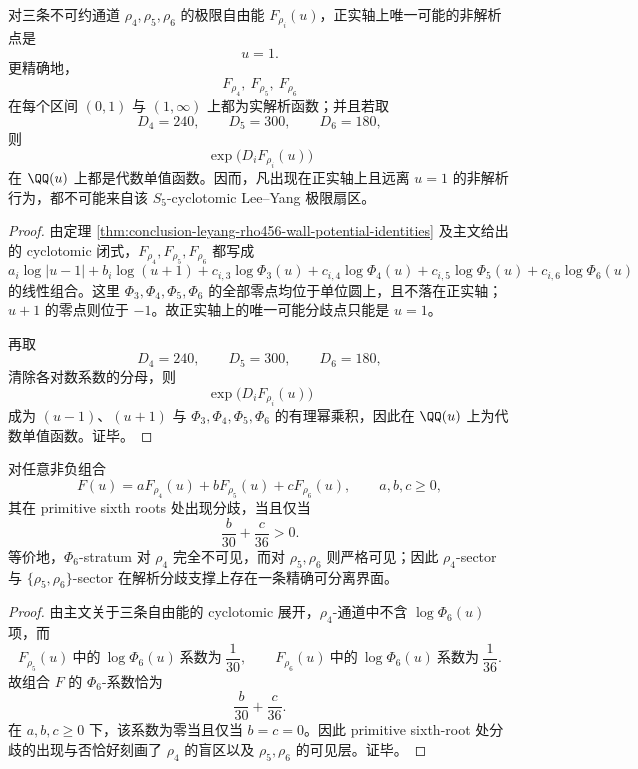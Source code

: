 \begin{theorem}\label{thm:conclusion-leyang-rho456-positive-axis-singularity-exclusion}
对三条不可约通道 \(\rho_4,\rho_5,\rho_6\) 的极限自由能 \(F_{\rho_i}(u)\)，正实轴上唯一可能的非解析点是
\[
u=1.
\]
更精确地，
\[
F_{\rho_4},\ F_{\rho_5},\ F_{\rho_6}
\]
在每个区间 \((0,1)\) 与 \((1,\infty)\) 上都为实解析函数；并且若取
\[
D_4=240,\qquad D_5=300,\qquad D_6=180,
\]
则
\[
\exp\!\bigl(D_iF_{\rho_i}(u)\bigr)
\]
在 \(\QQ(u)\) 上都是代数单值函数。因而，凡出现在正实轴上且远离 \(u=1\) 的非解析行为，都不可能来自该 \(S_5\)-cyclotomic Lee--Yang 极限扇区。
\end{theorem}
\begin{proof}
由定理 \ref{thm:conclusion-leyang-rho456-wall-potential-identities} 及主文给出的 cyclotomic 闭式，\(F_{\rho_4},F_{\rho_5},F_{\rho_6}\) 都写成
\[
a_i\log|u-1|+b_i\log(u+1)+
c_{i,3}\log\Phi_3(u)+
c_{i,4}\log\Phi_4(u)+
c_{i,5}\log\Phi_5(u)+
c_{i,6}\log\Phi_6(u)
\]
的线性组合。这里 \(\Phi_3,\Phi_4,\Phi_5,\Phi_6\) 的全部零点均位于单位圆上，且不落在正实轴；\(u+1\) 的零点则位于 \(-1\)。故正实轴上的唯一可能分歧点只能是 \(u=1\)。

再取
\[
D_4=240,\qquad D_5=300,\qquad D_6=180,
\]
清除各对数系数的分母，则
\[
\exp\!\bigl(D_iF_{\rho_i}(u)\bigr)
\]
成为 \((u-1)\)、\((u+1)\) 与 \(\Phi_3,\Phi_4,\Phi_5,\Phi_6\) 的有理幂乘积，因此在 \(\QQ(u)\) 上为代数单值函数。证毕。
\end{proof}

\begin{corollary}\label{cor:conclusion-leyang-rho456-phi6-visibility-separation}
对任意非负组合
\[
F(u)=aF_{\rho_4}(u)+bF_{\rho_5}(u)+cF_{\rho_6}(u),
\qquad a,b,c\ge 0,
\]
其在 primitive sixth roots 处出现分歧，当且仅当
\[
\frac{b}{30}+\frac{c}{36}>0.
\]
等价地，\(\Phi_6\)-stratum 对 \(\rho_4\) 完全不可见，而对 \(\rho_5,\rho_6\) 则严格可见；因此 \(\rho_4\)-sector 与 \(\{\rho_5,\rho_6\}\)-sector 在解析分歧支撑上存在一条精确可分离界面。
\end{corollary}
\begin{proof}
由主文关于三条自由能的 cyclotomic 展开，\(\rho_4\)-通道中不含 \(\log\Phi_6(u)\) 项，而
\[
F_{\rho_5}(u)\ \text{中的}\ \log\Phi_6(u)\ \text{系数为}\ \frac1{30},
\qquad
F_{\rho_6}(u)\ \text{中的}\ \log\Phi_6(u)\ \text{系数为}\ \frac1{36}.
\]
故组合 \(F\) 的 \(\Phi_6\)-系数恰为
\[
\frac{b}{30}+\frac{c}{36}.
\]
在 \(a,b,c\ge 0\) 下，该系数为零当且仅当 \(b=c=0\)。因此 primitive sixth-root 处分歧的出现与否恰好刻画了 \(\rho_4\) 的盲区以及 \(\rho_5,\rho_6\) 的可见层。证毕。
\end{proof}
